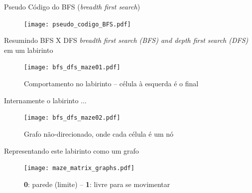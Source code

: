 \begin{frame}[c]{Pseudo Código do BFS (\textit{breadth first search})  }

 	\begin{figure}[!htpb]
	\centering
  \texttt{[image: pseudo\_codigo\_BFS.pdf]}
	\end{figure} 
\end{frame}

\begin{frame}[c]{Resumindo BFS X DFS \textit{breadth first search (BFS) and depth first search (DFS)} em um labirinto}

 	\begin{figure}[!htpb]
	\centering
  \texttt{[image: bfs\_dfs\_maze01.pdf]}
 \caption{Comportamento no labirinto -- célula à esquerda é o final}
	\end{figure} 
\end{frame}


\begin{frame}[c]{Internamente o labirinto ...}

 	\begin{figure}[!htpb]
	\centering
  \texttt{[image: bfs\_dfs\_maze02.pdf]}
 \caption{Grafo não-direcionado, onde cada célula é um nó}
	\end{figure} 
\end{frame}




\begin{frame}[c]{Representando este labirinto como um grafo}

 	\begin{figure}[!htpb]
	\centering
  \texttt{[image: maze\_matrix\_graphs.pdf]}
 \caption{\textbf{0}: parede (limite) -- \textbf{1}: livre para se movimentar}
	\end{figure} 
\end{frame}


